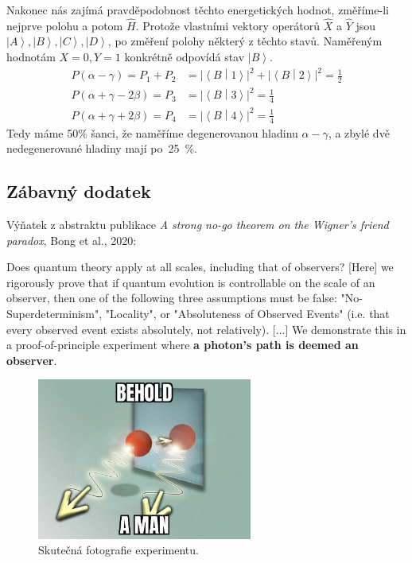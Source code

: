 \documentclass{article}
\newcommand{\ket}[1]{\left| #1 \right>}
\newcommand{\braket}[2]{\left< #1 \middle| #2 \right>}
\begin{document}
Nakonec nás zajímá pravděpodobnost těchto energetických hodnot, změříme-li nejprve polohu a potom $\hat H$. Protože vlastními vektory operátorů $\hat X$ a $\hat Y$ jsou $\ket{A}, \ket{B}, \ket{C}, \ket{D}$, po změření polohy některý z těchto stavů. Naměřeným hodnotám $X=0, Y=1$ konkrétně odpovídá stav $\ket{B}$.
\begin{align*}
    P(\alpha - \gamma) = P_1 + P_2
    &= \big|\braket{B}{1}\big|^2 + \big|\braket{B}{2}\big|^2
    = \frac{1}{2}
    \\[5pt]
    P(\alpha + \gamma - 2\beta) = P_3
    &= \big|\braket{B}{3}\big|^2
    = \frac{1}{4}
    \\[5pt]
    P(\alpha + \gamma + 2\beta) = P_4
    &= \big|\braket{B}{4}\big|^2
    = \frac{1}{4}
\end{align*}
Tedy máme 50\% šanci, že naměříme degenerovanou hladinu $\alpha - \gamma$, a zbylé dvě nedegenerované hladiny mají po~25~\%.

\subsection*{Zábavný dodatek}
Výňatek z abstraktu publikace \textit{A strong no-go theorem on the Wigner’s friend paradox}, Bong et al., 2020:

Does quantum theory apply at all scales, including that of observers? [Here] we rigorously prove that if quantum evolution is controllable on the scale of an observer, then one of the following three assumptions must be false: "No-Superdeterminism", "Locality", or "Absoluteness of Observed Events" (i.e. that every observed event exists absolutely, not relatively). [...] We demonstrate this in a proof-of-principle experiment where \textbf{a photon's path is deemed an observer}.

\begin{figure}[h!]
    \centering
    \includegraphics[width=200pt]{meme.jpg}
    \caption{Skutečná fotografie experimentu.}
  \label{fig:boat1}
\end{figure}
\end{document}
